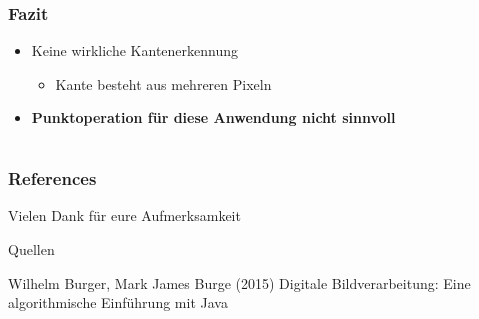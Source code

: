 \documentclass[12pt]{beamer}
\begin{document}
\begin{frame}
	\frametitle{Fazit}
	\begin{itemize}
		\item Keine wirkliche Kantenerkennung 
		\begin{itemize}
			\item Kante besteht aus mehreren Pixeln
		\end{itemize}
		\item \textbf{Punktoperation für diese Anwendung nicht sinnvoll}		
	\end{itemize}
\end{frame}

\section*{}

\begin{frame}
	\frametitle{References}
	\Large{Vielen Dank für eure Aufmerksamkeit}	
	\newline
	\begin{block}{Quellen}
		\small{	
		\begin{thebibliography}{99} %
			 Wilhelm Burger, Mark James Burge (2015)
			\newblock Digitale Bildverarbeitung: Eine algorithmische Einführung mit Java
		\end{thebibliography}
		}
	\end{block}
\end{frame}
\end{document}
